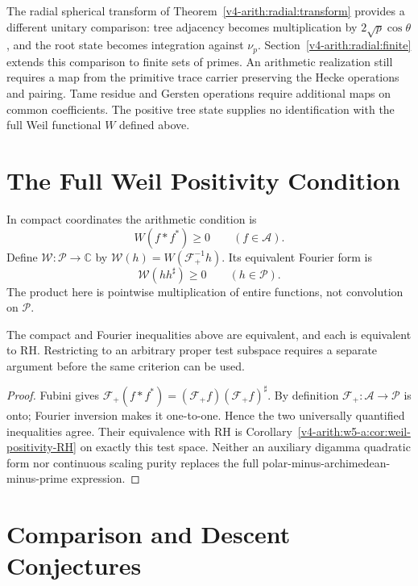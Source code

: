 The radial spherical transform of Theorem~\ref{v4-arith:radial:transform}
provides a different unitary comparison: tree adjacency becomes
multiplication by $2\sqrt p\cos\theta$, and the root state becomes
integration against $\nu_p$. Section~\ref{v4-arith:radial:finite}
extends this comparison to finite sets of primes. An arithmetic
realization still requires a map from the primitive trace carrier
preserving the Hecke operations and pairing. Tame residue and Gersten
operations require additional maps on common coefficients. The positive
tree state supplies no identification with the full Weil functional
$W$ defined above.

\section{The Full Weil Positivity Condition}
\label{v4-arith:w10-final:tier1}

In compact coordinates the arithmetic condition is
\begin{equation}
\label{v4-arith:w10-final:eq:atp}
 W(f*f^*)\ge0\qquad(f\in\mathscr A).
\end{equation}
Define $\mathscr W:\mathscr P\to\mathbb C$ by
$\mathscr W(h)=W(\mathcal F_+^{-1}h)$. Its equivalent Fourier form is
\[
 \mathscr W(hh^\sharp)\ge0\qquad(h\in\mathscr P).
\]
The product here is pointwise multiplication of entire functions,
not convolution on $\mathscr P$.

\begin{proposition}
\label{v4-arith:w10-final:prop:tier1}
The compact and Fourier inequalities above are equivalent, and each
is equivalent to RH. Restricting to an arbitrary proper test subspace
requires a separate argument before the same criterion can be used.
\end{proposition}

\begin{proof}
Fubini gives
$\mathcal F_+(f*f^*)=(\mathcal F_+f)(\mathcal F_+f)^\sharp$.
By definition $\mathcal F_+:\mathscr A\to\mathscr P$ is onto;
Fourier inversion makes it one-to-one. Hence the two universally
quantified inequalities agree. Their equivalence with RH is
Corollary~\ref{v4-arith:w5-a:cor:weil-positivity-RH} on exactly this test
space. Neither an auxiliary digamma quadratic form nor continuous
scaling purity replaces the full polar-minus-archimedean-minus-prime
expression.
\end{proof}

\section{Comparison and Descent Conjectures}
\label{v4-arith:w10-final:tier2}

